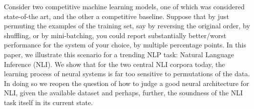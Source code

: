 Consider two competitive machine learning models, one of which was considered state-of-the art, and the other a competitive baseline.  Suppose that by just permuting the examples of the training set, say by reversing the original order, by shuffling, or by mini-batching, you could report substantially better/worst performance for the system of your choice, by multiple percentage points.  In this paper, we illustrate this scenario for a trending NLP task: Natural Language Inference (NLI).  We show that for the two central NLI corpora today, the learning process of neural systems is far too sensitive to permutations of the data. In doing so we reopen the question of how to judge a good neural architecture for NLI, given the available dataset and perhaps, further, the soundness of the NLI task itself in its current state.
